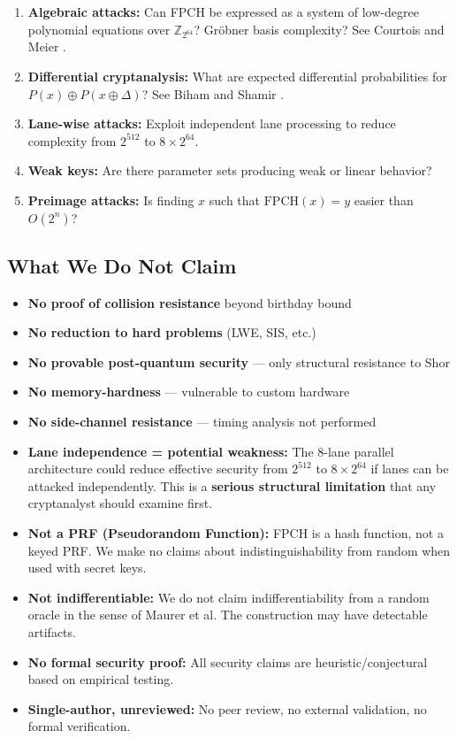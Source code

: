 \documentclass[11pt,a4paper]{article}
\theoremstyle{plain}
\theoremstyle{definition}
\theoremstyle{remark}
\begin{document}
\begin{enumerate}
    \item \textbf{Algebraic attacks:} Can FPCH be expressed as a system of low-degree polynomial equations over $\mathbb{Z}_{2^{64}}$? Gr\"obner basis complexity? See Courtois and Meier \cite{courtois2003}.
    \item \textbf{Differential cryptanalysis:} What are expected differential probabilities for $P(x) \oplus P(x \oplus \Delta)$? See Biham and Shamir \cite{biham1991}.
    \item \textbf{Lane-wise attacks:} Exploit independent lane processing to reduce complexity from $2^{512}$ to $8 \times 2^{64}$.
    \item \textbf{Weak keys:} Are there parameter sets producing weak or linear behavior?
    \item \textbf{Preimage attacks:} Is finding $x$ such that $\text{FPCH}(x) = y$ easier than $O(2^n)$?
\end{enumerate}

\subsection{What We Do Not Claim}

\begin{itemize}
    \item \textbf{No proof of collision resistance} beyond birthday bound
    \item \textbf{No reduction to hard problems} (LWE, SIS, etc.)
    \item \textbf{No provable post-quantum security} --- only structural resistance to Shor
    \item \textbf{No memory-hardness} --- vulnerable to custom hardware
    \item \textbf{No side-channel resistance} --- timing analysis not performed
    \item \textbf{Lane independence = potential weakness:} The 8-lane parallel architecture could reduce effective security from $2^{512}$ to $8 \times 2^{64}$ if lanes can be attacked independently. This is a \textbf{serious structural limitation} that any cryptanalyst should examine first.
    \item \textbf{Not a PRF (Pseudorandom Function):} FPCH is a hash function, not a keyed PRF. We make no claims about indistinguishability from random when used with secret keys.
    \item \textbf{Not indifferentiable:} We do not claim indifferentiability from a random oracle in the sense of Maurer et al. The construction may have detectable artifacts.
    \item \textbf{No formal security proof:} All security claims are heuristic/conjectural based on empirical testing.
    \item \textbf{Single-author, unreviewed:} No peer review, no external validation, no formal verification.
\end{itemize}
\end{document}
